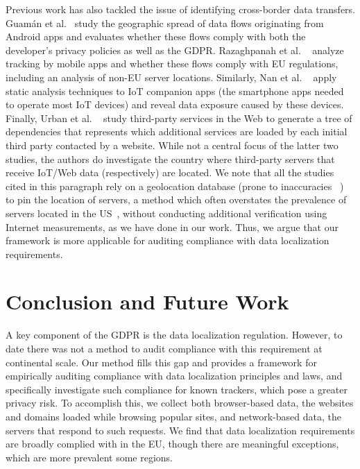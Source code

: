 Previous work has also tackled the issue of identifying cross-border data 
transfers. %
Guam{\'a}n et al.~\cite{9328756} study
the geographic spread of data flows originating from Android apps and evaluates
whether these flows comply with both the developer's privacy policies as
well as the GDPR. 
Razaghpanah et al. ~\cite{DBLP:conf/ndss/RazaghpanahNVSA18}
analyze tracking by mobile apps and whether these flows comply with
EU regulations, including an analysis of non-EU server locations.
Similarly, Nan et al. ~\cite{285453}
apply static analysis techniques to IoT companion apps (the smartphone apps needed to operate 
most IoT devices) and reveal data exposure caused by these devices.
Finally, Urban et al. ~\cite{10.1145/3366423.3380203} study third-party services in the
Web to generate a tree of dependencies that represents which additional services
are loaded by each initial third party contacted by a website.
While not a central focus of the latter two studies,
the authors do investigate the country where third-party servers that receive IoT/Web data (respectively) are located.
We note that all the studies cited in this paragraph rely on a geolocation
database (prone to inaccuracies ~\cite{10.1145/1971162.1971171, 10.1007/978-3-030-98785-5_6}) to pin the location of servers,
a method which often overstates the prevalence of servers located in the US~\cite{10.1145/3278532.3278561}, 
without conducting additional verification using Internet measurements,
as we have done in our work. Thus, we argue that our framework is more applicable
for auditing compliance with data localization requirements.



\section{Conclusion and Future Work}
A key component of the GDPR is the data localization regulation.
However, to date there was not a method to audit compliance
with this requirement at continental scale.
Our method fills this gap and provides a framework 
for empirically auditing compliance
with data localization principles and laws, and specifically investigate
such compliance for known trackers, which pose a greater privacy risk.
To accomplish this, we collect both browser-based data, the websites and 
domains loaded while browsing popular sites, and network-based data,
the servers that respond to such requests. We find that 
data localization requirements are broadly complied with in the EU,
though there are meaningful exceptions, which are more prevalent 
some regions. %

